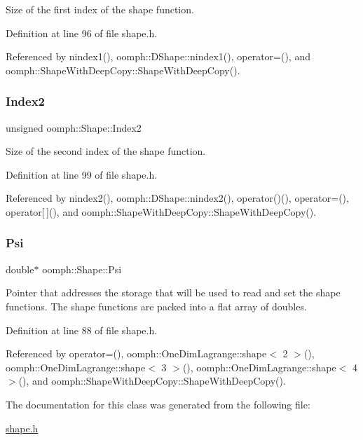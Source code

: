 Size of the first index of the shape function. 



Definition at line 96 of file shape.\+h.



Referenced by nindex1(), oomph\+::\+D\+Shape\+::nindex1(), operator=(), and oomph\+::\+Shape\+With\+Deep\+Copy\+::\+Shape\+With\+Deep\+Copy().

\mbox{\label{classoomph_1_1Shape_aae154e349eaa0a2f4b415c2bdaef0708}} 
\subsubsection{\texorpdfstring{Index2}{Index2}}
{\footnotesize\ttfamily unsigned oomph\+::\+Shape\+::\+Index2\hspace{0.3cm}{\ttfamily [protected]}}



Size of the second index of the shape function. 



Definition at line 99 of file shape.\+h.



Referenced by nindex2(), oomph\+::\+D\+Shape\+::nindex2(), operator()(), operator=(), operator\mbox{[}$\,$\mbox{]}(), and oomph\+::\+Shape\+With\+Deep\+Copy\+::\+Shape\+With\+Deep\+Copy().

\mbox{\label{classoomph_1_1Shape_ae045962e578d675877663404b177d301}} 
\subsubsection{\texorpdfstring{Psi}{Psi}}
{\footnotesize\ttfamily double$\ast$ oomph\+::\+Shape\+::\+Psi\hspace{0.3cm}{\ttfamily [protected]}}



Pointer that addresses the storage that will be used to read and set the shape functions. The shape functions are packed into a flat array of doubles. 



Definition at line 88 of file shape.\+h.



Referenced by operator=(), oomph\+::\+One\+Dim\+Lagrange\+::shape$<$ 2 $>$(), oomph\+::\+One\+Dim\+Lagrange\+::shape$<$ 3 $>$(), oomph\+::\+One\+Dim\+Lagrange\+::shape$<$ 4 $>$(), and oomph\+::\+Shape\+With\+Deep\+Copy\+::\+Shape\+With\+Deep\+Copy().



The documentation for this class was generated from the following file\+:\begin{DoxyCompactItemize}
\item 
\hyperlink{shape_8h}{shape.\+h}\end{DoxyCompactItemize}
